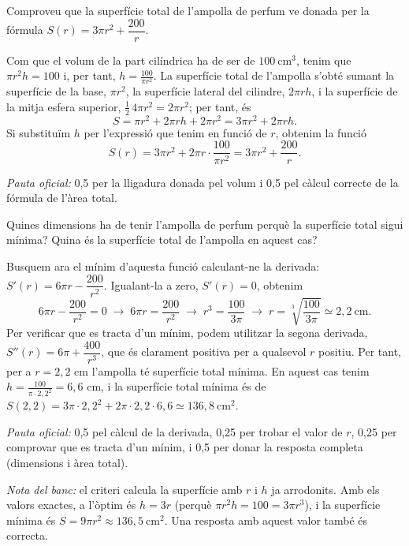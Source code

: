 \begin{apartats}

Comproveu que la superfície total de l'ampolla de perfum ve donada per la fórmula $S(r)=3\pi r^2+\dfrac{200}{r}$.

\begin{solucio}
Com que el volum de la part cilíndrica ha de ser de $100\ \text{cm}^3$, tenim que $\pi r^2h=100$ i, per tant,
$h=\frac{100}{\pi r^2}$. La superfície total de l'ampolla s'obté sumant la superfície de la base, $\pi r^2$, la
superfície lateral del cilindre, $2\pi rh$, i la superfície de la mitja esfera superior,
$\frac12\,4\pi r^2=2\pi r^2$; per tant, és
\[
S=\pi r^2+2\pi rh+2\pi r^2=3\pi r^2+2\pi rh .
\]
Si substituïm $h$ per l'expressió que tenim en funció de $r$, obtenim la funció
\[
S(r)=3\pi r^2+2\pi r\cdot\frac{100}{\pi r^2}=3\pi r^2+\frac{200}{r}.
\]

\textit{Pauta oficial:} 0,5 per la lligadura donada pel volum i 0,5 pel càlcul correcte de la fórmula de
l'àrea total.
\end{solucio}

Quines dimensions ha de tenir l'ampolla de perfum perquè la superfície total sigui mínima? Quina és la
superfície total de l'ampolla en aquest cas?

\begin{solucio}
Busquem ara el mínim d'aquesta funció calculant-ne la derivada: $S'(r)=6\pi r-\dfrac{200}{r^2}$. Igualant-la a
zero, $S'(r)=0$, obtenim
\[
6\pi r-\frac{200}{r^2}=0\;\rightarrow\;6\pi r=\frac{200}{r^2}\;\rightarrow\;r^3=\frac{100}{3\pi}\;\rightarrow\;
r=\sqrt[3]{\frac{100}{3\pi}}\simeq2{,}2\ \text{cm}.
\]
Per verificar que es tracta d'un mínim, podem utilitzar la segona derivada, $S''(r)=6\pi+\dfrac{400}{r^3}$, que
és clarament positiva per a qualsevol $r$ positiu. Per tant, per a $r=2{,}2$ cm l'ampolla té superfície total
mínima. En aquest cas tenim $h=\frac{100}{\pi\cdot2{,}2^2}=6{,}6$ cm, i la superfície total mínima és de
$S(2{,}2)=3\pi\cdot2{,}2^2+2\pi\cdot2{,}2\cdot6{,}6\simeq136{,}8\ \text{cm}^2$.

\textit{Pauta oficial:} 0,5 pel càlcul de la derivada, 0,25 per trobar el valor de $r$, 0,25 per comprovar que
es tracta d'un mínim, i 0,5 per donar la resposta completa (dimensions i àrea total).

\textit{Nota del banc:} el criteri calcula la superfície amb $r$ i $h$ ja arrodonits. Amb els valors exactes,
a l'òptim és $h=3r$ (perquè $\pi r^2h=100=3\pi r^3$), i la superfície mínima és
$S=9\pi r^2\approx136{,}5\ \text{cm}^2$. Una resposta amb aquest valor també és correcta.
\end{solucio}

\end{apartats}
